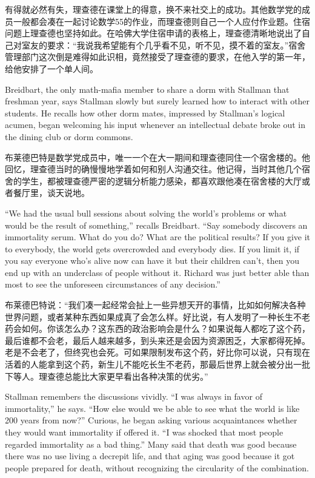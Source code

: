 \ifdefined\chs
有得就必然有失，理查德在课堂上的得意，换不来社交上的成功。其他数学党的成员一般都会凑在一起讨论数学55的作业，而理查德则自己一个人应付作业题。住宿问题上理查德也坚持如此。在哈佛大学住宿申请的表格上，理查德清晰地说出了自己对室友的要求：``我说我希望能有个几乎看不见，听不见，摸不着的室友。''宿舍管理部门这次倒是难得如此识相，竟然接受了理查德的要求，在他入学的第一年，给他安排了一个单人间。
\fi

\ifdefined\eng
Breidbart, the only math-mafia member to share a dorm with Stallman that freshman year, says Stallman slowly but surely learned how to interact with other students. He recalls how other dorm mates, impressed by Stallman's logical acumen, began welcoming his input whenever an intellectual debate broke out in the dining club or dorm commons.
\fi

\ifdefined\chs
布莱德巴特是数学党成员中，唯一一个在大一期间和理查德同住一个宿舍楼的。他回忆，理查德当时的确慢慢地学着如何和别人沟通交往。他记得，当时其他几个宿舍的学生，都被理查德严密的逻辑分析能力感染，都喜欢跟他凑在宿舍楼的大厅或者餐厅里，谈天说地。
\fi

\ifdefined\eng
``We had the usual bull sessions about solving the world's problems or what would be the result of something,'' recalls Breidbart. ``Say somebody discovers an immortality serum. What do you do? What are the political results? If you give it to everybody, the world gets overcrowded and everybody dies. If you limit it, if you say everyone who's alive now can have it but their children can't, then you end up with an underclass of people without it. Richard was just better able than most to see the unforeseen circumstances of any decision.''
\fi

\ifdefined\chs
布莱德巴特说：``我们凑一起经常会扯上一些异想天开的事情，比如如何解决各种世界问题，或者某种东西如果成真了会怎么样。好比说，有人发明了一种长生不老药会如何。你该怎么办？这东西的政治影响会是什么？如果说每人都吃了这个药，最后谁都不会老，最后人越来越多，到头来还是会因为资源困乏，大家都得死掉。老是不会老了，但终究也会死。可如果限制发布这个药，好比你可以说，只有现在活着的人能拿到这个药，新生儿不能吃长生不老药，那最后世界上就会被分出一批下等人。理查德总能比大家更早看出各种决策的优劣。''
\fi

\ifdefined\eng
Stallman remembers the discussions vividly. ``I was always in favor of immortality,'' he says. ``How else would we be able to see what the world is like 200 years from now?'' Curious, he began asking various acquaintances whether they would want immortality if offered it. ``I was shocked that most people regarded immortality as a bad thing.'' Many said that death was good because there was no use living a decrepit life, and that aging was good because it got people prepared for death, without recognizing the circularity of the combination.
\fi

